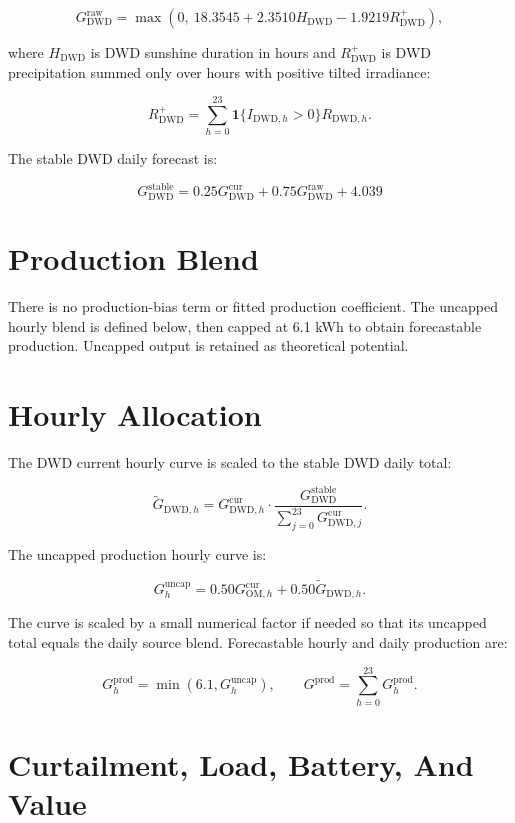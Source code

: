 \documentclass[11pt,a4paper]{article}
\begin{document}
\[
G^{\mathrm{raw}}_{\mathrm{DWD}}
=
\max\left(0,\ 18.3545 + 2.3510 H_{\mathrm{DWD}} - 1.9219 R^{+}_{\mathrm{DWD}}\right),
\]

where \(H_{\mathrm{DWD}}\) is DWD sunshine duration in hours and \(R^{+}_{\mathrm{DWD}}\) is DWD precipitation summed only over hours with positive tilted irradiance:

\[
R^{+}_{\mathrm{DWD}}
=
\sum_{h=0}^{23}
\mathbf{1}\{I_{\mathrm{DWD},h} > 0\} R_{\mathrm{DWD},h}.
\]

The stable DWD daily forecast is:

\[
\boxed{
G^{\mathrm{stable}}_{\mathrm{DWD}}
=
0.25 G^{\mathrm{cur}}_{\mathrm{DWD}}
+ 0.75 G^{\mathrm{raw}}_{\mathrm{DWD}}
+ 4.039
}
\]

\section{Production Blend}

There is no production-bias term or fitted production coefficient. The uncapped hourly blend is defined below, then capped at 6.1 kWh to obtain forecastable production. Uncapped output is retained as theoretical potential.

\section{Hourly Allocation}

The DWD current hourly curve is scaled to the stable DWD daily total:

\[
\widetilde{G}_{\mathrm{DWD},h}
=
G^{\mathrm{cur}}_{\mathrm{DWD},h}
\cdot
\frac{G^{\mathrm{stable}}_{\mathrm{DWD}}}
{\sum_{j=0}^{23}G^{\mathrm{cur}}_{\mathrm{DWD},j}}.
\]

The uncapped production hourly curve is:

\[
G^{\mathrm{uncap}}_h
=
0.50G^{\mathrm{cur}}_{\mathrm{OM},h}
+ 0.50\widetilde{G}_{\mathrm{DWD},h}.
\]

The curve is scaled by a small numerical factor if needed so that its uncapped total equals the daily source blend. Forecastable hourly and daily production are:

\[
G^{\mathrm{prod}}_h = \min(6.1, G^{\mathrm{uncap}}_h),
\qquad
G^{\mathrm{prod}} = \sum_{h=0}^{23}G^{\mathrm{prod}}_h.
\]

\section{Curtailment, Load, Battery, And Value}
\end{document}

